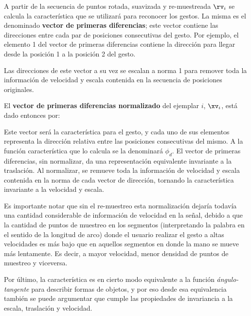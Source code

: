 

A partir de la secuencia de puntos rotada, suavizada y re-muestreada $\rv_i$ se calcula la característica que se utilizará para reconocer los gestos. La misma es el denominado \textbf{vector de primeras diferencias}; este vector contiene las direcciones entre cada par de posiciones consecutivas del gesto. Por ejemplo, el elemento 1 del vector de primeras diferencias contiene la dirección para llegar desde la posición 1 a la posición 2 del gesto.

Las direcciones de este vector a su vez se escalan a norma 1 para remover toda la información de velocidad y escala contenida en la secuencia de posiciones originales. 


El \textbf{vector de primeras diferencias normalizado} del ejemplar $i$, $\xv_i$, está dado entonces por:


Este vector será la característica para el gesto, y cada uno de sus elementos representa la dirección relativa entre las posiciones consecutivas del mismo. A la función característica que lo calcula se la denominará $\phi_d$. El vector de primeras diferencias, sin normalizar, da una representación equivalente invariante a la traslación. Al normalizar, se remueve toda la información de velocidad y escala contenida en la norma de cada vector de dirección, tornando la característica invariante a la velocidad y escala. 

Es importante notar que sin el re-muestreo esta normalización dejaría todavía una cantidad considerable de información de velocidad en la señal, debido a que la cantidad de puntos de muestreo en los segmentos (interpretando la palabra en el sentido de la longitud de arco) donde el usuario realizar el gesto a altas velocidades es más bajo que en aquellos segmentos en donde la mano se mueve más lentamente. Es decir, a mayor velocidad, menor densidad de puntos de muestreo y viceversa. 

Por último, la característica es en cierto modo equivalente a la función \textit{ángulo-tangente} \cite{Kindratenko:2003} para describir formas de objetos, y por eso desde esa equivalencia también se puede argumentar que cumple las propiedades de invariancia a la escala, traslación y velocidad.

